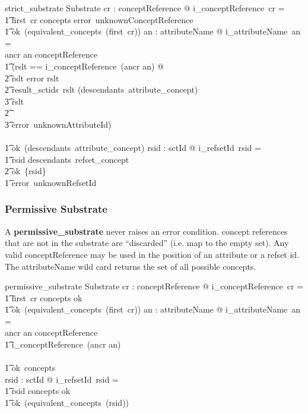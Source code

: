 \documentclass{article}
\begin{document}
\begin{schema}{strict\_substrate}
    Substrate
 \where
    \forall cr : conceptReference @ i\_conceptReference~cr = \\
\t1 \IF first~cr \notin concepts \THEN error~unknownConceptReference \\
\t1 \ELSE ok~(equivalent\_concepts~(first~cr))
\also
   \forall an : attributeName @ i\_attributeName~an = \\
\IF ancr \inv an \in conceptReference \THEN \\
\t1   (\LET rslt == i\_conceptReference~(ancr \inv an) @ \\
\t2 \IF rslt \in \ran error \THEN rslt \\
\t2 \ELSE \IF result\_sctids~rslt \subseteq (descendants~attribute\_concept)  \\
\t3 \THEN rslt \\
\t2 \ELSE \\
\t3 error~unknownAttributeId) \\
\ELSE \\
\t1 ok~(descendants~attribute\_concept)
\also
  \forall rsid : sctId @ i\_refsetId~rsid = \\
\t1  \IF rsid \in descendants~refset\_concept  \\
\t2 \THEN ok~\{rsid\} \\
\t1 \ELSE error~unknownRefsetId
\end{schema}
     
 
 \subsubsection{Permissive Substrate}
 A \textbf{permissive\_substrate} never raises an error condition.  concept references that are not in the substrate are ``discarded'' (i.e. map to the empty set).  Any valid conceptReference may be used in the position of an attribute or a refset id.  The attributeName wild card returns the set of all possible concepts.
\begin{schema}{permissive\_substrate}
    Substrate
 \where
    \forall cr : conceptReference @ i\_conceptReference~cr = \\
\t1 \IF first~cr \notin concepts \THEN ok~ \emptyset \\
\t1 \ELSE ok~(equivalent\_concepts~(first~cr))
\also
   \forall an : attributeName @ i\_attributeName~an = \\
\IF ancr \inv an \in conceptReference \THEN \\
\t1 i\_conceptReference~(ancr \inv an) \\
\ELSE \\
\t1 ok~concepts \\
\also
  \forall rsid : sctId @ i\_refsetId~rsid = \\
\t1 \IF rsid \notin concepts \THEN ok~ \emptyset \\
\t1 \ELSE ok~(equivalent\_concepts~(rsid))
\end{schema}
\end{document}
